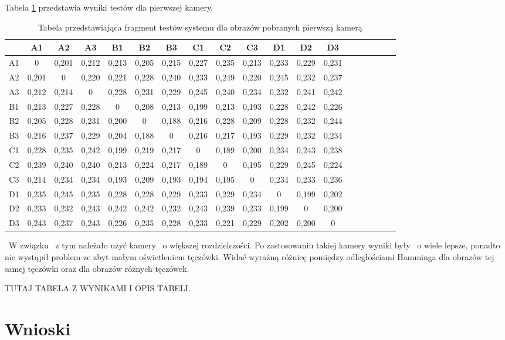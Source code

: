 Tabela \ref{tab:pierwsza} przedstawia wyniki testów dla pierwszej kamery.
\begin{table}
\caption{Tabela przedstawiająca fragment testów systemu dla obrazów pobranych pierwszą kamerą}
\label{tab:pierwsza}
\begin{tabular}{|c|c|c|c|c|c|c|c|c|c|c|c|c|c|c|c|c|c|c|}
\hline
 & A1 & A2 & A3 & B1 & B2 & B3 & C1 & C2 & C3 & D1 & D2 & D3\\ \hline
A1 & 0&0,201&0,212&0,213&0,205&0,215&0,227&0,235&0,213&0,233&0,229&0,231 \\ \hline
A2 & 0,201&0&0,220&0,221&0,228&0,240&0,233&0,249&0,220&0,245&0,232&0,237 \\ \hline
A3 & 0,212&0,214&0&0,228&0,231&0,229&0,245&0,240&0,234&0,232&0,241&0,242\\ \hline
B1 & 0,213&0,227&0,228&0&0,208&0,213&0,199&0,213&0,193&0,228&0,242&0,226\\ \hline
B2 & 0,205&0,228&0,231&0,200&0&0,188&0,216&0,228&0,209&0,228&0,232&0,244\\ \hline
B3 & 0,216&0,237&0,229&0,204&0,188&0&0,216&0,217&0,193&0,229&0,232&0,234\\ \hline
C1 & 0,228&0,235&0,242&0,199&0,219&0,217&0&0,189&0,200&0,234&0,243&0,238\\ \hline
C2 & 0,239&0,240&0,240&0,213&0,224&0,217&0,189&0&0,195&0,229&0,245&0,224\\ \hline
C3 & 0,214&0,234&0,234&0,193&0,209&0,193&0,194&0,195&0&0,234&0,233&0,236\\ \hline
D1 & 0,235&0,245&0,235&0,228&0,228&0,229&0,233&0,229&0,234&0&0,199&0,202\\ \hline
D2 & 0,233&0,232&0,243&0,242&0,242&0,232&0,243&0,239&0,233&0,199&0&0,200\\ \hline
D3 & 0,243&0,237&0,243&0,226&0,235&0,228&0,233&0,221&0,229&0,202&0,200&0\\ \hline

\end{tabular}
\end{table}

~W związku ~z tym należało użyć kamery ~o większej rozdzielczości. Po zastosowaniu takiej kamery wyniki były ~o wiele lepsze, ponadto nie wystąpił problem ze zbyt małym oświetleniem tęczówki. Widać wyraźną różnicę pomiędzy odległościami Hamminga dla obrazów tej samej tęczówki oraz dla obrazów różnych tęczówek.

TUTAJ TABELA Z WYNIKAMI I OPIS TABELI.

\section{Wnioski}
\label{sec:wnioski}

